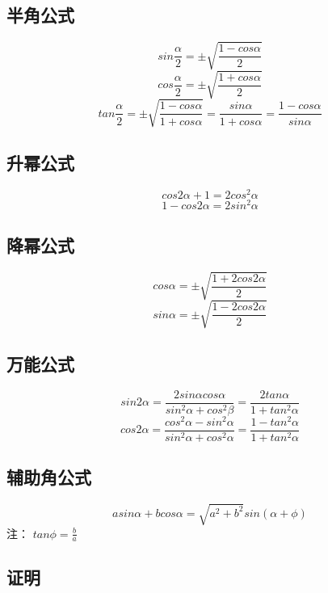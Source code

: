 \subsection{半角公式}
\begin{equation}
sin\frac{\alpha}{2} = \pm\sqrt{\frac{1-cos\alpha}{2}}
\end{equation}
\begin{equation}
cos\frac{\alpha}{2}= \pm\sqrt{\frac{1+cos\alpha}{2}}
\end{equation}
\begin{equation}
tan\frac{\alpha}{2} = \pm\sqrt{\frac{1-cos\alpha}{1+cos\alpha}} = \frac{sin\alpha}{1+cos\alpha} = \frac{1-cos\alpha}{sin\alpha}
\end{equation}

\subsection{升幂公式}
\begin{equation}
cos2\alpha + 1 = 2cos^2\alpha
\end{equation}
\begin{equation}
1-cos2\alpha = 2sin^2\alpha
\end{equation}

\subsection{降幂公式}
\begin{equation}
cos\alpha = \pm\sqrt{\frac{1+2cos2\alpha}{2}}
\end{equation}
\begin{equation}
sin\alpha = \pm\sqrt{\frac{1-2cos2\alpha}{2}}
\end{equation}

\subsection{万能公式}
\begin{equation}
sin2\alpha = \frac{2sin\alpha cos\alpha}{sin^2\alpha + cos^2\beta} = \frac{2tan\alpha}{1+tan^2\alpha}
\end{equation}
\begin{equation}
cos2\alpha = \frac{cos^2\alpha-sin^2\alpha}{sin^2\alpha+cos^2\alpha} = \frac{1-tan^2\alpha}{1+tan^2\alpha}
\end{equation}

\subsection{辅助角公式}
\begin{equation}
asin\alpha + bcos\alpha = \sqrt{a^2+b^2}sin(\alpha + \phi)
\end{equation}
注： $tan\phi = \frac{b}{a}$

\subsection{证明}
\subsubsection{}